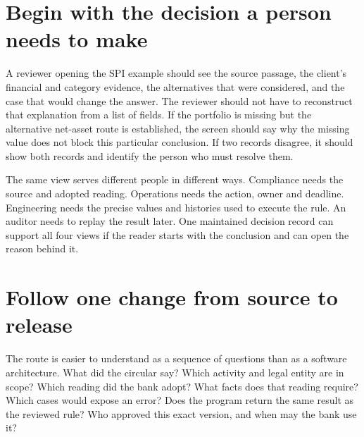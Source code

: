 \documentclass[12pt,a4paper,oneside,openany]{book}
\begin{document}
\section{Begin with the decision a person needs to make}

A reviewer opening the SPI example should see the source passage, the client's
financial and category evidence, the alternatives that were considered, and the
case that would change the answer. The reviewer should not have to reconstruct
that explanation from a list of fields. If the portfolio is missing but the
alternative net-asset route is established, the screen should say why the missing
value does not block this particular conclusion. If two records disagree, it
should show both records and identify the person who must resolve them.

The same view serves different people in different ways. Compliance needs the
source and adopted reading. Operations needs the action, owner and deadline.
Engineering needs the precise values and histories used to execute the rule. An
auditor needs to replay the result later. One maintained decision record can
support all four views if the reader starts with the conclusion and can open the
reason behind it.

\section{Follow one change from source to release}

The route is easier to understand as a sequence of questions than as a software
architecture. What did the circular say? Which activity and legal entity are in
scope? Which reading did the bank adopt? What facts does that reading require?
Which cases would expose an error? Does the program return the same result as the
reviewed rule? Who approved this exact version, and when may the bank use it?
\end{document}
